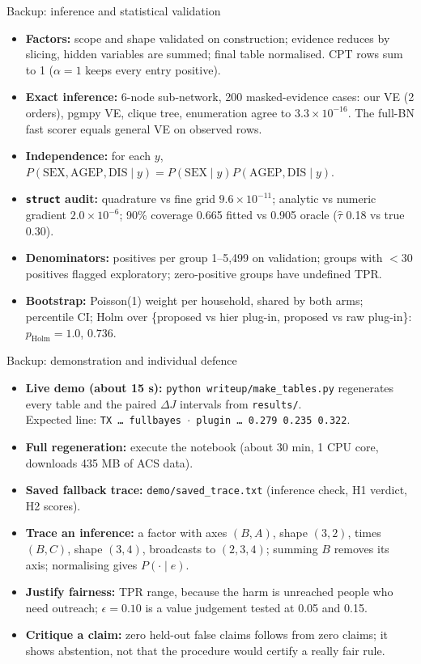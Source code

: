 \documentclass[aspectratio=169,11pt]{beamer}
\begin{document}
\begin{frame}{Backup: inference and statistical validation}
\small
\begin{itemize}
\item \textbf{Factors:} scope and shape validated on construction; evidence reduces by slicing, hidden variables are summed;
  final table normalised. CPT rows sum to 1 ($\alpha=1$ keeps every entry positive).
\item \textbf{Exact inference:} 6-node sub-network, 200 masked-evidence cases: our VE (2 orders), pgmpy VE, clique tree,
  enumeration agree to $3.3\times10^{-16}$. The full-BN fast scorer equals general VE on observed rows.
\item \textbf{Independence:} for each $y$, $P(\text{SEX},\text{AGEP},\text{DIS}\mid y)=P(\text{SEX}\mid y)P(\text{AGEP},\text{DIS}\mid y)$.
\item \textbf{\texttt{struct} audit:} quadrature vs fine grid $9.6\times10^{-11}$; analytic vs numeric gradient $2.0\times10^{-6}$;
  90\% coverage 0.665 fitted vs 0.905 oracle ($\hat\tau$ 0.18 vs true 0.30).
\item \textbf{Denominators:} positives per group 1--5,499 on validation; groups with $<30$ positives flagged exploratory;
  zero-positive groups have undefined TPR.
\item \textbf{Bootstrap:} Poisson(1) weight per household, shared by both arms; percentile CI; Holm over
  \{proposed vs hier plug-in, proposed vs raw plug-in\}: $p_{\text{Holm}}=1.0$, $0.736$.
\end{itemize}
\end{frame}

\begin{frame}{Backup: demonstration and individual defence}
\small
\begin{itemize}
\item \textbf{Live demo (about 15 s):} \texttt{python writeup/make\_tables.py} regenerates every table and the
  paired $\Delta J$ intervals from \texttt{results/}.\\ Expected line: \texttt{TX \dots{} fullbayes $\cdot$ plugin \dots{} 0.279 0.235 0.322}.
\item \textbf{Full regeneration:} execute the notebook (about 30 min, 1 CPU core, downloads 435 MB of ACS data).
\item \textbf{Saved fallback trace:} \texttt{demo/saved\_trace.txt} (inference check, H1 verdict, H2 scores).
\item \textbf{Trace an inference:} a factor with axes $(B,A)$, shape $(3,2)$, times $(B,C)$, shape $(3,4)$, broadcasts to $(2,3,4)$;
  summing $B$ removes its axis; normalising gives $P(\cdot\mid e)$.
\item \textbf{Justify fairness:} TPR range, because the harm is unreached people who need outreach; $\epsilon=0.10$ is a
  value judgement tested at 0.05 and 0.15.
\item \textbf{Critique a claim:} zero held-out false claims follows from zero claims; it shows abstention, not that the
  procedure would certify a really fair rule.
\end{itemize}
\end{frame}
\end{document}
